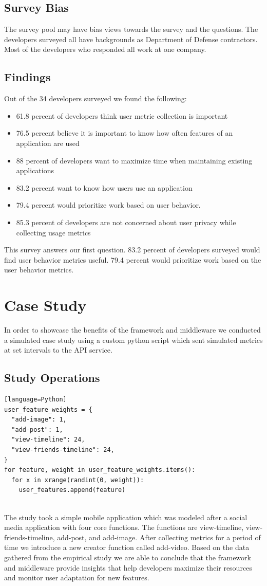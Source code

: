 \subsection{Survey Bias}
The survey pool may have bias views towards the survey and the questions. The developers surveyed all have backgrounds as Department of Defense contractors. Most of the developers who responded all work at one company. 

\subsection{Findings}
Out of the 34 developers surveyed we found the following:
\begin{itemize}
  \item 61.8 percent of developers think user metric collection is important 
  \item 76.5 percent believe it is important to know how often features of an application are used
  \item 88 percent of developers want to maximize time when maintaining existing applications 
  \item 83.2 percent want to know how users use an application
  \item 79.4 percent would prioritize work based on user behavior. 
  \item 85.3 percent of developers are not concerned about user privacy while collecting usage metrics
\end{itemize}
This survey answers our first question. 83.2 percent of developers surveyed would find user behavior metrics useful. 79.4 percent would prioritize work based on the user behavior metrics.

\section{Case Study}
In order to showcase the benefits of the framework and middleware we conducted a simulated case study using a custom python script which sent simulated metrics at set intervals to the API service. 

\subsection{Study Operations}
\begin{lstlisting}[caption=sim.py Example][language=Python]
user_feature_weights = {
  "add-image": 1,
  "add-post": 1,
  "view-timeline": 24,
  "view-friends-timeline": 24,
}
for feature, weight in user_feature_weights.items():
  for x in xrange(randint(0, weight)):
    user_features.append(feature)
    
\end{lstlisting}
The study took a simple mobile application which was modeled after a social media application with four core functions. The functions are view-timeline, view-friends-timeline, add-post, and add-image. After collecting metrics for a period of time we introduce a new creator function called add-video. Based on the data gathered from the empirical study we are able to conclude that the framework and middleware provide insights that help developers maximize their resources and monitor user adaptation for new features.

